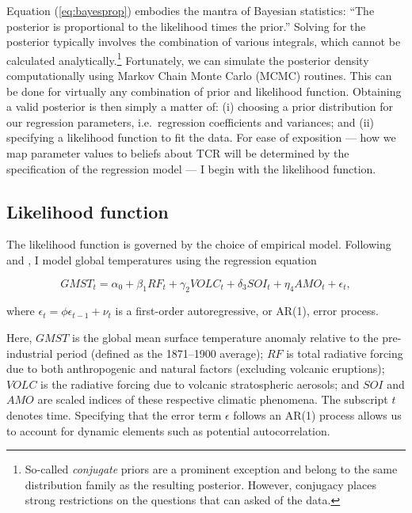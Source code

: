 \documentclass[smallextended]{svjour3}       %
\begin{document}
Equation (\ref{eq:bayesprop}) embodies the mantra of Bayesian
statistics: ``The posterior is proportional to the likelihood times the
prior.'' Solving for the posterior typically involves the combination of
various integrals, which cannot be calculated analytically.\footnote{So-called
  \textit{conjugate} priors are a prominent exception and belong to the
  same distribution family as the resulting posterior. However,
  conjugacy places strong restrictions on the questions that can asked
  of the data.} Fortunately, we can simulate the posterior density
computationally using Markov Chain Monte Carlo (MCMC) routines. This can
be done for virtually any combination of prior and likelihood function.
Obtaining a valid posterior is then simply a matter of: (i) choosing a
prior distribution for our regression parameters, i.e.~regression
coefficients and variances; and (ii) specifying a likelihood function to
fit the data. For ease of exposition --- how we map parameter values to
beliefs about TCR will be determined by the specification of the
regression model --- I begin with the likelihood function.

\hypertarget{sec:likelihood}{%
\subsection{Likelihood function}\label{sec:likelihood}}

The likelihood function is governed by the choice of empirical model.
Following \cite{estrada2012breaks} and \cite{estrada2013statistically},
I model global temperatures using the regression equation

\begin{equation}
   GMST_t = \alpha_0 + \beta_1RF_t + \gamma_2VOLC_t + \delta_3SOI_t + \eta_4AMO_t + \epsilon_t, \label{eq:regression}
\end{equation}

where \(\epsilon_t = \phi \epsilon_{t-1} + \nu_t\) is a first-order
autoregressive, or AR(1), error process.

Here, \(GMST\) is the global mean surface temperature anomaly relative
to the pre-industrial period (defined as the 1871--1900 average); \(RF\)
is total radiative forcing due to both anthropogenic and natural factors
(excluding volcanic eruptions); \(VOLC\) is the radiative forcing due to
volcanic stratospheric aerosols; and \(SOI\) and \(AMO\) are scaled
indices of these respective climatic phenomena. The subscript \(t\)
denotes time. Specifying that the error term \(\epsilon\) follows an
AR(1) process allows us to account for dynamic elements such as
potential autocorrelation.
\end{document}
